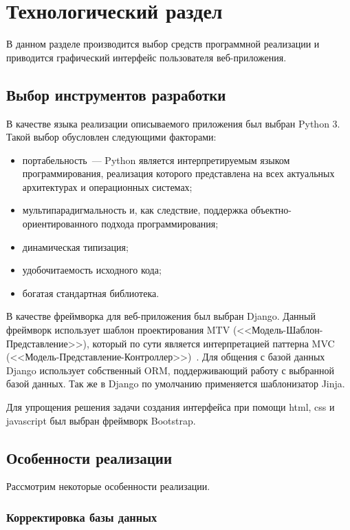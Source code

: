 \chapter{Технологический раздел}%
\label{cha:tekhnologicheskii_razdel}

В данном разделе производится выбор средств программной реализации и приводится графический интерфейс пользователя веб-приложения.

\section{Выбор инструментов разработки}%
\label{sec:vybor_instrumentov_razrabotki}

В качестве языка реализации описываемого приложения был выбран Python 3. Такой выбор обусловлен следующими факторами:
\begin{itemize}
    \item портабельность~--- Python является интерпретируемым языком программирования, реализация которого представлена на всех актуальных архитектурах и операционных системах;
    \item мультипарадигмальность и, как следствие, поддержка объектно-ориентированного подхода программирования;
    \item динамическая типизация;
    \item удобочитаемость исходного кода;
    \item богатая стандартная библиотека.
\end{itemize}

В качестве фреймворка для веб-приложения был выбран Django. Данный фреймворк использует шаблон проектирования MTV (<<Модель-Шаблон-Представление>>), который по сути является интерпретацией паттерна MVC (<<Модель-Представление-Контроллер>>)~\cite{django}. Для общения с базой данных Django использует собственный ORM, поддерживающий работу с выбранной базой данных. Так же в Django по умолчанию применяется шаблонизатор Jinja.

Для упрощения решения задачи создания интерфейса при помощи html, css и javascript был выбран фреймворк Bootstrap\cite{boot}.

\section{Особенности реализации}%
\label{sec:osobennosti_realizatsii}

Рассмотрим некоторые особенности реализации.

\subsection{Корректировка базы данных}%
\label{sub:korrektirovka_bazy_dannykh}

